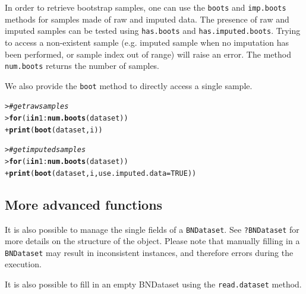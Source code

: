 \documentclass{article}\usepackage[]{graphicx}\usepackage[]{color}
\makeatletter
\newcommand{\hlnum}[1]{\textcolor[rgb]{0.686,0.059,0.569}{#1}}%
\newcommand{\hlcom}[1]{\textcolor[rgb]{0.678,0.584,0.686}{\textit{#1}}}%
\newcommand{\hlopt}[1]{\textcolor[rgb]{0,0,0}{#1}}%
\newcommand{\hlstd}[1]{\textcolor[rgb]{0.345,0.345,0.345}{#1}}%
\newcommand{\hlkwa}[1]{\textcolor[rgb]{0.161,0.373,0.58}{\textbf{#1}}}%
\newcommand{\hlkwc}[1]{\textcolor[rgb]{0.333,0.667,0.333}{#1}}%
\newcommand{\hlkwd}[1]{\textcolor[rgb]{0.737,0.353,0.396}{\textbf{#1}}}%
\newenvironment{kframe}{%
 \def\at@end@of@kframe{}%
 \ifinner\ifhmode%
  \def\at@end@of@kframe{\end{minipage}}%
  \begin{minipage}{\columnwidth}%
 \fi\fi%
 \def\FrameCommand##1{\hskip\@totalleftmargin \hskip-\fboxsep
 \colorbox{shadecolor}{##1}\hskip-\fboxsep
     \hskip-\linewidth \hskip-\@totalleftmargin \hskip\columnwidth}%
 \MakeFramed {\advance\hsize-\width
   \@totalleftmargin\z@ \linewidth\hsize
   \@setminipage}}%
 {\par\unskip\endMakeFramed%
 \at@end@of@kframe}
\newenvironment{knitrout}{}{} %
\newcommand{\Robject}[1]{{\texttt{#1}}}
\newcommand{\Rmethod}[1]{{\texttt{#1}}}
\makeatother
\begin{document}
In order to retrieve bootstrap samples, one can use the \Rmethod{boots} and \Rmethod{imp.boots} methods for samples
made of raw and imputed data. The presence of raw and imputed samples can be tested using \Rmethod{has.boots} and \Rmethod{has.imputed.boots}.
Trying to access a non-existent sample (e.g. imputed sample when no imputation has been performed,
or sample index out of range) will raise an error. The method \Rmethod{num.boots} returns the number of samples.

We also provide the \Rmethod{boot} method to directly access a single sample.

\begin{knitrout}
\color{fgcolor}\begin{kframe}
\begin{alltt}
\hlstd{> }\hlcom{# get raw samples}
\hlstd{> }\hlkwa{for} \hlstd{(i} \hlkwa{in} \hlnum{1}\hlopt{:}\hlkwd{num.boots}\hlstd{(dataset))}
\hlstd{+ }  \hlkwd{print}\hlstd{(} \hlkwd{boot}\hlstd{(dataset, i) )}
\end{alltt}
\end{kframe}
\end{knitrout}

\begin{knitrout}
\color{fgcolor}\begin{kframe}
\begin{alltt}
\hlstd{> }\hlcom{# get imputed samples}
\hlstd{> }\hlkwa{for} \hlstd{(i} \hlkwa{in} \hlnum{1}\hlopt{:}\hlkwd{num.boots}\hlstd{(dataset))}
\hlstd{+ }  \hlkwd{print}\hlstd{(} \hlkwd{boot}\hlstd{(dataset, i,} \hlkwc{use.imputed.data} \hlstd{=} \hlnum{TRUE}\hlstd{) )}
\end{alltt}
\end{kframe}
\end{knitrout}

\subsection{More advanced functions}
It is also possible to manage the single fields of a \Robject{BNDataset}. See \texttt{?BNDataset}
for more details on the structure of the object. Please note that manually filling in a \Robject{BNDataset}
may result in inconsistent instances, and therefore errors during the execution.

It is also possible to fill in an empty BNDataset using the \Rmethod{read.dataset} method.
\end{document}
